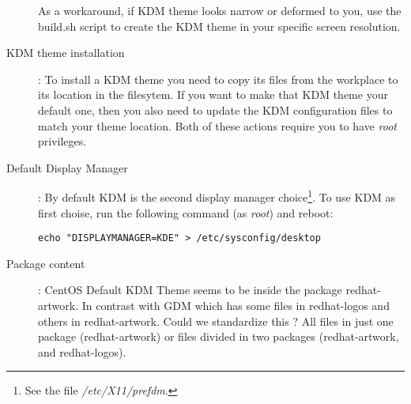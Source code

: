 \documentclass{article}
\begin{document}
\begin{description}
As a workaround, if KDM theme looks narrow or deformed to you, use the
build.sh script to create the KDM theme in your specific screen
resolution.

\item[KDM theme installation]: To install a KDM theme you need to copy
its files from the workplace to its location in the filesytem. If you
want to make that KDM theme your default one, then you also need to
update the KDM configuration files to match your theme location. Both
of these actions require you to have \emph{root} privileges.

\item[Default Display Manager]: By default KDM is the second display
manager choice\footnote{See the file \emph{/etc/X11/prefdm}.}. To use
KDM as first choise, run the following command (as \emph{root}) and
reboot:

\texttt{echo "DISPLAYMANAGER=KDE" > /etc/sysconfig/desktop}

\item[Package content]: CentOS Default KDM Theme seems to be inside
the package redhat-artwork. In contrast with GDM which has some files in
redhat-logos and others in redhat-artwork. Could we standardize this ?
All files in just one package (redhat-artwork) or files divided in two
packages (redhat-artwork, and redhat-logos).

\end{description}


\end{document}
